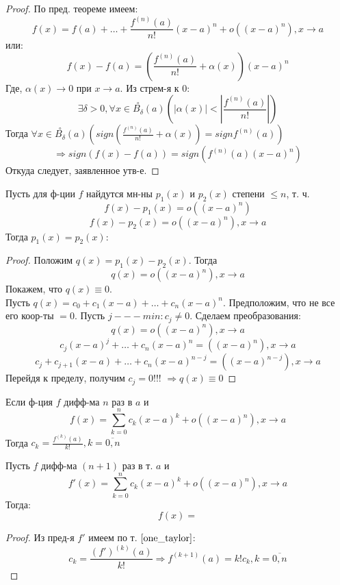 \begin{proof}
По пред. теореме имеем:
\[
f(x) = f(a) + \ldots + \frac{f^{(n)}(a)}{n!}(x - a)^{n} + o((x - a)^{n}), x \rightarrow a
\]
или:
\[
f(x) - f(a) = \left(\frac{f^{(n)}(a)}{n!} + \alpha(x)\right)(x - a)^{n}
\]
Где,  $\alpha(x) \rightarrow 0$ при $x \rightarrow a$. Из стрем-я к $0$:
\[
\exists \delta > 0, \forall x \in \overset{\circ}{B_{\delta}}(a) \left(\left|\alpha(x)\right| < \left|\frac{f^{(n)}(a)}{n!}\right|\right)
\]
Тогда $\forall x \in \overset{\circ}{B_{\delta}}(a) \left(sign(\frac{f^{(n)}(a)}{n!} + \alpha(x)) = sign f^{(n)}(a)\right)$ 
\[
\Rightarrow sign(f(x) - f(a)) = sign(f^{(n)}(a)(x - a)^{n})
\]
Откуда следует, заявленное утв-е. 
\end{proof}
\begin{theorem}[Единственность]
  Пусть для ф-ции $f$ найдутся мн-ны $p_1(x)$ и $p_2(x)$ степени $\leq n$, т. ч.
  \[
  f(x) - p_1(x) = o((x - a)^{n})
  \]
  \[
  f(x) - p_2(x) = o((x - a)^{n}), x \rightarrow a
  \]
  Тогда $p_1(x) = p_2(x)$:
\end{theorem}
\begin{proof}
Положим $q(x) = p_1(x) - p_2(x)$. Тогда
\[
  q(x) = o((x - a)^{n}), x \rightarrow a
\]
Покажем, что $q(x) \equiv 0$. \\

Пусть $q(x) = c_0 + c_1(x - a) + \ldots + c_n(x - a)^{n}$. Предположим, что не все его коор-ты $ = 0$. Пусть $j --- min \colon c_j \neq 0$. Сделаем преобразования:
\[
  q(x) = o((x - a)^{n}), x \rightarrow a
\]
\[
  c_j(x - a)^{j} + \ldots + c_n(x - a)^{n} = ((x - a)^{n}), x \rightarrow a
\]
\[
  c_j + c_{j + 1}(x - a) + \ldots + c_n (x - a)^{n - j} = ((x - a)^{n - j}), x \rightarrow a
\]
Перейдя к пределу, получим $c_j = 0$!!! $\Rightarrow q(x) \equiv 0$
\end{proof}
\begin{theorem}
  \label{one_taylor}
Если ф-ция $f$ дифф-ма $n$ раз в $a$ и
\[
f(x) = \sum_{k = 0}^{n} c_k (x - a)^{k} + o((x - a)^{n}), x \rightarrow a
\]
Тогда $c_k = \frac{f^{(k)}(a)}{k!}, k = \overline{0, n}$
\end{theorem}
\begin{consequence}
Пусть $f$ дифф-ма $(n + 1)$ раз в т. $a$ и
\[
  f'(x) = \sum_{k = 0}^{n} c_k (x - a)^{k} + o((x - a)^{n}), x \rightarrow a
\]
Тогда:
\[
f(x) = 
\]
\end{consequence}
\begin{proof}
Из пред-я $f'$ имеем по т. $\ref{one_taylor}$:
\[
c_k = \frac{(f')^{(k)}(a)}{k!} \Rightarrow f^{(k + 1)}(a) = k! c_k, k = \overline{0, n}
\]
\end{proof}
